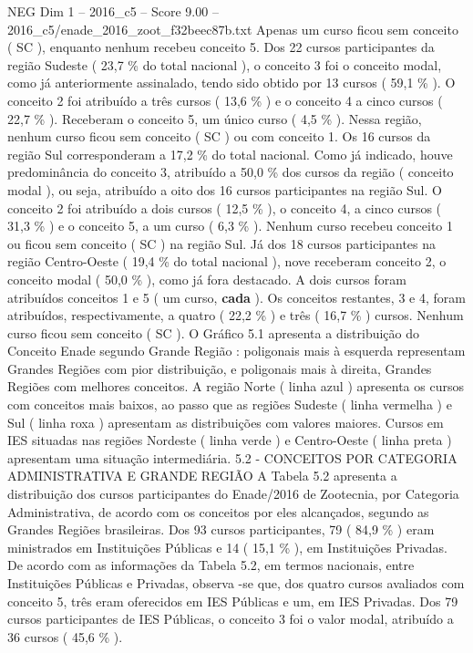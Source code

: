 \begin{textsample}{NEG Dim 1 – 2016\_c5 – Score 9.00 – 2016\_c5/enade\_2016\_zoot\_f32beec87b.txt}
Apenas um curso ficou sem conceito ( SC ), enquanto nenhum recebeu conceito 5.
Dos 22 cursos participantes da região Sudeste ( 23,7 \% do total nacional ), o conceito 3 foi o conceito modal, como já anteriormente assinalado, tendo sido obtido por 13 cursos ( 59,1 \% ).
O conceito 2 foi atribuído a três cursos ( 13,6 \% ) e o conceito 4 a cinco cursos ( 22,7 \% ).
Receberam o conceito 5, um único curso ( 4,5 \% ).
Nessa região, nenhum curso ficou sem conceito ( SC ) ou com conceito 1.
Os 16 cursos da região Sul corresponderam a 17,2 \% do total nacional.
Como já indicado, houve predominância do conceito 3, atribuído a 50,0 \% dos cursos da região ( conceito modal ), ou seja, atribuído a oito dos 16 cursos participantes na região Sul.
O conceito 2 foi atribuído a dois cursos ( 12,5 \% ), o conceito 4, a cinco cursos ( 31,3 \% ) e o conceito 5, a um curso ( 6,3 \% ).
Nenhum curso recebeu conceito 1 ou ficou sem conceito ( SC ) na região Sul.
Já dos 18 cursos participantes na região Centro-Oeste ( 19,4 \% do total nacional ), nove receberam conceito 2, o conceito modal ( 50,0 \% ), como já fora destacado.
A dois cursos foram atribuídos conceitos 1 e 5 ( um curso, \textbf{cada} ).
Os conceitos restantes, 3 e 4, foram atribuídos, respectivamente, a quatro ( 22,2 \% ) e três ( 16,7 \% ) cursos.
Nenhum curso ficou sem conceito ( SC ).
O Gráfico 5.1 apresenta a distribuição do Conceito Enade segundo Grande Região : poligonais mais à esquerda representam Grandes Regiões com pior distribuição, e poligonais mais à direita, Grandes Regiões com melhores conceitos.
A região Norte ( linha azul ) apresenta os cursos com conceitos mais baixos, ao passo que as regiões Sudeste ( linha vermelha ) e Sul ( linha roxa ) apresentam as distribuições com valores maiores.
Cursos em IES situadas nas regiões Nordeste ( linha verde ) e Centro-Oeste ( linha preta ) apresentam uma situação intermediária. 5.2 - CONCEITOS POR CATEGORIA ADMINISTRATIVA E GRANDE REGIÃO A Tabela 5.2 apresenta a distribuição dos cursos participantes do Enade/2016 de Zootecnia, por Categoria Administrativa, de acordo com os conceitos por eles alcançados, segundo as Grandes Regiões brasileiras.
Dos 93 cursos participantes, 79 ( 84,9 \% ) eram ministrados em Instituições Públicas e 14 ( 15,1 \% ), em Instituições Privadas.
De acordo com as informações da Tabela 5.2, em termos nacionais, entre Instituições Públicas e Privadas, observa -se que, dos quatro cursos avaliados com conceito 5, três eram oferecidos em IES Públicas e um, em IES Privadas.
Dos 79 cursos participantes de IES Públicas, o conceito 3 foi o valor modal, atribuído a 36 cursos ( 45,6 \% ).

\end{textsample}

